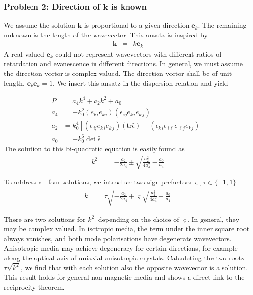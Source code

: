 \documentclass[12pt,a4paper,twoside,openright,BCOR10mm,headsepline,titlepage,abstracton,chapterprefix,final]{scrreprt}
\newcommand\Vector[1]{{\mathbf{#1}}}
\newcommand\wavenumber{k}
\newcommand\Wavevector{\Vector{\wavenumber}}
\newcommand\Tensor[1]{\hat{#1}}
\newcommand\scalarrelativepermittivity{\epsilon}
\newcommand\relativepermittivity{\Tensor{\scalarrelativepermittivity}}
\newcommand\tr{\text{tr}}
\begin{document}
\subsubsection{Problem 2: Direction of $\Wavevector$ is known}
We assume the solution $\Wavevector$ is proportional to a given direction $\Vector{e}_\wavenumber$.
The remaining unknown is the length of the wavevector. This ansatz is inspired by \cite{Doering:1957, wiki:Kristalloptik}.
\begin{eqnarray}
 \Wavevector &=& \wavenumber \Vector{e}_\wavenumber
\end{eqnarray}
A real valued $\Vector{e}_\wavenumber$ could not represent wavevectors with different ratios of retardation and evanescence in different directions.
In general, we must assume the direction vector is complex valued.
The direction vector shall be of unit length, $\Vector{e}_\wavenumber \overline{\Vector{e}_\wavenumber} = 1$.
We insert this ansatz in the dispersion relation and yield

\begin{align}
 P &= a_4 \wavenumber^4 + a_2 \wavenumber^2 + a_0
 \\
 a_4 &= - k_0^2 (e_{k\,i} e_{k\,i}) (\scalarrelativepermittivity_{\,ij} e_{k\,i} e_{k\,j})
 \\
 a_2 &=   k_0^4 \left[ (\scalarrelativepermittivity_{\,ij} e_{k\,i} e_{k\,j}) (\tr\relativepermittivity) - (e_{k\,i} \scalarrelativepermittivity_{\,i\ell} \scalarrelativepermittivity_{\,\ell j} e_{k\,j}) \right]
 \\
 a_0 &= - k_0^6 \det \relativepermittivity
\end{align}
The solution to this bi-quadratic equation is easily found as
\begin{eqnarray}
 \wavenumber^2 &=& - \frac{a_2}{2 a_4} \pm \sqrt{\frac{a_2^2}{4 a_4^2} - \frac{a_0}{a_4}} 
\end{eqnarray}

To address all four solutions, we introduce two sign prefactors $\varsigma, \tau \in \{ -1,1\}$
\begin{eqnarray}
 \wavenumber &=& \tau \sqrt{ - \frac{a_2}{2 a_4} + \varsigma \sqrt{\frac{a_2^2}{4 a_4^2} - \frac{a_0}{a_4}} } \label{eq:dispersion_for_known_direction}
\end{eqnarray}

There are two solutions for $\wavenumber^2$, depending on the choice of $\varsigma$.
In general, they may be complex valued.
In isotropic media, the term under the inner square root always vanishes, and both mode polarisations have degenerate wavevectors.
Anisotropic media may achieve degeneracy for certain directions, 
for example along the optical axis of uniaxial anisotropic crystals.
Calculating the two roots $\tau \sqrt{\wavenumber^2}$, we find that with each solution
also the opposite wavevector is a solution.
This result holds for general non-magnetic media and shows a direct link to the reciprocity theorem.
\end{document}
